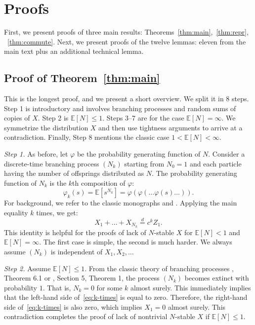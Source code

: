 \documentclass[12pt]{amsart}
\theoremstyle{remark}
\theoremstyle{definition}
\begin{document}
\section{Proofs}

First, we present proofs of three main results: Theorems~\ref{thm:main},~\ref{thm:repr},
~\ref{thm:commute}. Next, we present proofs of the twelve lemmas: eleven from the main text plus an additional technical lemma. 

\subsection{Proof of Theorem~\ref{thm:main}} 

This is the longest proof, and we present a short overview. We split it in 8 steps. Step 1  is introductory and involves branching processes and random sums of copies of $X$. Step 2 is $\mathbb E[N] \le 1$. Steps 3--7 are for the case $\mathbb E[N] = \infty$. We symmetrize the distribution $X$ and then use tightness arguments to arrive at a contradiction. Finally, Step 8 mentions the classic case $1 < \mathbb E[N] < \infty$. 

{\it Step 1.} As before, let $\varphi$ be the probability generating function of $N$. Consider a discrete-time branching process $(N_k)$ starting from $N_0 = 1$ and each particle having the number of offsprings distributed as $N$. The probability generating function of $N_k$ is the $k$th composition of $\varphi$:
$$
\varphi_k(s) = \mathbb E\left[s^{N_k}\right] = \varphi(\varphi(\ldots\varphi(s)\ldots)).
$$
For background, we refer to the classic monographs \cite[Chapter 1]{Harris} and \cite[Chapter I]{AthreyaBook}. Applying the main equality $k$ times, we get:
\begin{equation}
\label{eq:k-times}
X_1 + \ldots + X_{N_k} \stackrel{d}{=} c^kZ_1.
\end{equation}
This identity is helpful for the proofs of lack of $N$-stable $X$ for $\mathbb E[N] < 1$ and $\mathbb E[N] = \infty$. The first case is simple, the second is much harder. We always assume $(N_k)$ is independent of $X_1, X_2, \ldots$ 

{\it Step 2.} Assume $\mathbb E[N] \le 1$. From the classic theory of branching processes \cite[Chapter 1]{Harris}, Theorem 6.1 or \cite[Chapter I]{AthreyaBook}, Section 5, Theorem 1, the process $(N_k)$ becomes extinct with probability $1$. That is, $N_k = 0$ for some $k$ almost surely. This immediately implies that the left-hand side of~\eqref{eq:k-times} is equal to zero. Therefore, the right-hand side of~\eqref{eq:k-times} is also zero, which implies $X_1 = 0$ almost surely. This contradiction completes the proof of lack of nontrivial $N$-stable $X$ if $\mathbb E[N] \le 1$. 
\end{document}
